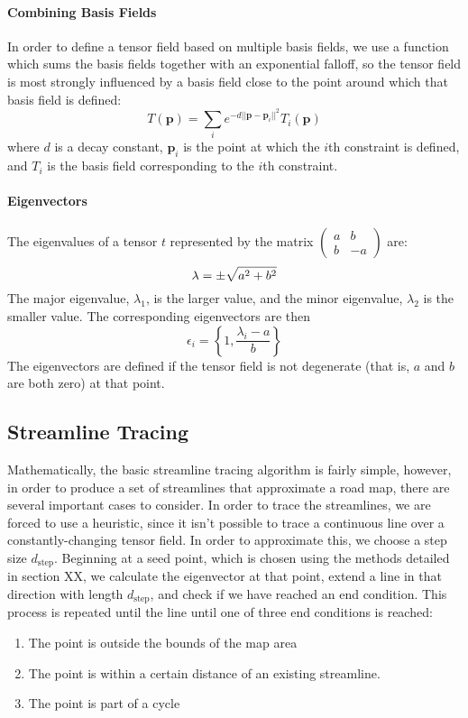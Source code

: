 \documentclass[twocolumn]{article}
\newcommand{\sqmat}[4]{\ensuremath{
    \left(\begin{array}{cc}
        #1 & #2 \\
        #3 & #4
    \end{array}\right)}}
\newcommand{\pt}{\textbf{p}}
\begin{document}
\paragraph{Combining Basis Fields}
In order to define a tensor field based on multiple basis fields, we use a
function which sums the basis fields together with an exponential falloff,
so the tensor field is most strongly influenced by a basis field close to
the point around which that basis field is defined:
\[
    T(\pt) = \sum_i e^{-d||\pt-\pt_i||^2}T_i(\pt)
\]
where $d$ is a decay constant, $\pt_i$ is the point at which the $i$th
constraint is defined, and $T_i$ is the basis field corresponding to the $i$th
constraint.

\paragraph{Eigenvectors}
The eigenvalues of a tensor $t$ represented by the matrix $\sqmat{a}{b}{b}{-a}$
are:
\[
    \lambda = \pm\sqrt{a^2+b^2} \\
\]
The major eigenvalue, $\lambda_1$, is the larger value, and the minor
eigenvalue, $\lambda_2$ is the smaller value. The corresponding eigenvectors
are then
\[
    \epsilon_i = \left\{1,\frac{\lambda_i-a}{b}\right\}
\]
The eigenvectors are defined if the tensor field is not degenerate (that is,
$a$ and $b$ are both zero) at that point.

\subsection{Streamline Tracing}
Mathematically, the basic streamline tracing algorithm is fairly simple,
however, in order to produce a set of streamlines that approximate a road map,
there are several important cases to consider. In order to trace the
streamlines, we are forced to use a heuristic, since it isn’t possible to trace
a continuous line over a constantly-changing tensor field. In order to
approximate this, we choose a step size $d_\textrm{step}$. Beginning at a seed
point, which is chosen using the methods detailed in section XX, we calculate
the eigenvector at that point, extend a line in that direction with length
$d_\textrm{step}$, and check if we have reached an end condition.  This process
is repeated until the line until one of three end conditions is reached:
\begin{enumerate}
    \item The point is outside the bounds of the map area
    \item The point is within a certain distance of an existing streamline.
    \item The point is part of a cycle
\end{enumerate}
\end{document}
